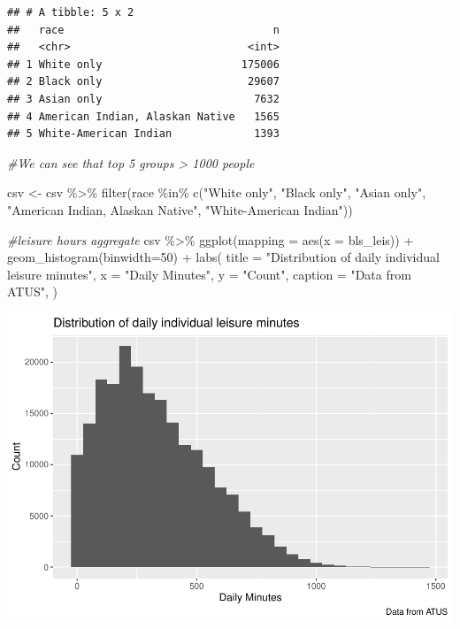 \documentclass[
]{article}
\newenvironment{Shaded}{\begin{snugshade}}{\end{snugshade}}
\newcommand{\AttributeTok}[1]{\textcolor[rgb]{0.77,0.63,0.00}{#1}}
\newcommand{\CommentTok}[1]{\textcolor[rgb]{0.56,0.35,0.01}{\textit{#1}}}
\newcommand{\DecValTok}[1]{\textcolor[rgb]{0.00,0.00,0.81}{#1}}
\newcommand{\FunctionTok}[1]{\textcolor[rgb]{0.00,0.00,0.00}{#1}}
\newcommand{\NormalTok}[1]{#1}
\newcommand{\OtherTok}[1]{\textcolor[rgb]{0.56,0.35,0.01}{#1}}
\newcommand{\SpecialCharTok}[1]{\textcolor[rgb]{0.00,0.00,0.00}{#1}}
\newcommand{\StringTok}[1]{\textcolor[rgb]{0.31,0.60,0.02}{#1}}
\begin{document}
\begin{verbatim}
## # A tibble: 5 x 2
##   race                                 n
##   <chr>                            <int>
## 1 White only                      175006
## 2 Black only                       29607
## 3 Asian only                        7632
## 4 American Indian, Alaskan Native   1565
## 5 White-American Indian             1393
\end{verbatim}

\begin{Shaded}
\begin{Highlighting}[]
\CommentTok{\#We can see that top 5 groups \textgreater{} 1000 people}

\NormalTok{csv }\OtherTok{\textless{}{-}}\NormalTok{ csv }\SpecialCharTok{\%\textgreater{}\%}
  \FunctionTok{filter}\NormalTok{(race }\SpecialCharTok{\%in\%} \FunctionTok{c}\NormalTok{(}\StringTok{"White only"}\NormalTok{, }\StringTok{"Black only"}\NormalTok{, }\StringTok{"Asian only"}\NormalTok{, }\StringTok{"American Indian, Alaskan Native"}\NormalTok{, }\StringTok{"White{-}American Indian"}\NormalTok{)) }
\end{Highlighting}
\end{Shaded}

\begin{Shaded}
\begin{Highlighting}[]
\CommentTok{\#leisure hours aggregate}
\NormalTok{csv }\SpecialCharTok{\%\textgreater{}\%}
  \FunctionTok{ggplot}\NormalTok{(}\AttributeTok{mapping =} \FunctionTok{aes}\NormalTok{(}\AttributeTok{x =}\NormalTok{ bls\_leis)) }\SpecialCharTok{+}
  \FunctionTok{geom\_histogram}\NormalTok{(}\AttributeTok{binwidth=}\DecValTok{50}\NormalTok{) }\SpecialCharTok{+}
  \FunctionTok{labs}\NormalTok{(}
  \AttributeTok{title =} \StringTok{"Distribution of daily individual leisure minutes"}\NormalTok{,}
  \AttributeTok{x =} \StringTok{"Daily Minutes"}\NormalTok{,}
  \AttributeTok{y =} \StringTok{"Count"}\NormalTok{,}
  \AttributeTok{caption =} \StringTok{"Data from ATUS"}\NormalTok{,}
\NormalTok{) }
\end{Highlighting}
\end{Shaded}

\includegraphics{Paper2_files/figure-latex/graphs-1.pdf}
\end{document}
